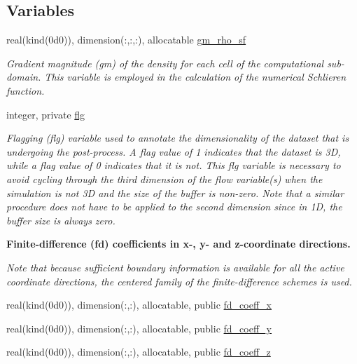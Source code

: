 \subsection*{Variables}
\begin{DoxyCompactItemize}
\item 
real(kind(0d0)), dimension(\+:,\+:,\+:), allocatable \hyperlink{namespacem__derived__variables_a102e235b77ff78573a043c5c9b9bb0d8}{gm\+\_\+rho\+\_\+sf}
\begin{DoxyCompactList}\small\item\em Gradient magnitude (gm) of the density for each cell of the computational sub-\/domain. This variable is employed in the calculation of the numerical Schlieren function. \end{DoxyCompactList}\item 
integer, private \hyperlink{namespacem__derived__variables_a2a27e1fa08c6751186a38d562b826955}{flg}
\begin{DoxyCompactList}\small\item\em Flagging (flg) variable used to annotate the dimensionality of the dataset that is undergoing the post-\/process. A flag value of 1 indicates that the dataset is 3D, while a flag value of 0 indicates that it is not. This flg variable is necessary to avoid cycling through the third dimension of the flow variable(s) when the simulation is not 3D and the size of the buffer is non-\/zero. Note that a similar procedure does not have to be applied to the second dimension since in 1D, the buffer size is always zero. \end{DoxyCompactList}\end{DoxyCompactItemize}
\begin{Indent}\textbf{ Finite-\/difference (fd) coefficients in x-\/, y-\/ and z-\/coordinate directions.}\par
{\em Note that because sufficient boundary information is available for all the active coordinate directions, the centered family of the finite-\/difference schemes is used. }\begin{DoxyCompactItemize}
\item 
real(kind(0d0)), dimension(\+:,\+:), allocatable, public \hyperlink{namespacem__derived__variables_a4f61d6bef7f53e49a0f5e4a3f9577912}{fd\+\_\+coeff\+\_\+x}
\item 
real(kind(0d0)), dimension(\+:,\+:), allocatable, public \hyperlink{namespacem__derived__variables_ab273055cd131e3ce73c1f468b78af7b7}{fd\+\_\+coeff\+\_\+y}
\item 
real(kind(0d0)), dimension(\+:,\+:), allocatable, public \hyperlink{namespacem__derived__variables_a3cafc9204d5773653e119ce3a3b98722}{fd\+\_\+coeff\+\_\+z}
\end{DoxyCompactItemize}
\end{Indent}


